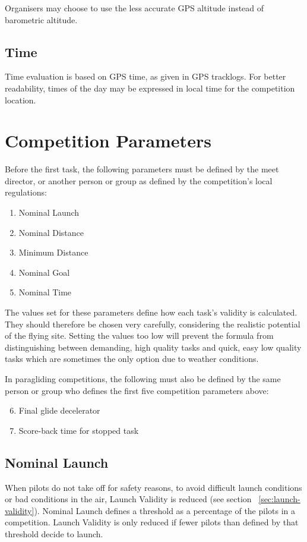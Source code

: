 \documentclass{article}
\begin{document}
Organisers may choose to use the less accurate GPS altitude instead of
barometric altitude.

\subsection{Time}
Time evaluation is based on GPS time, as given in GPS tracklogs. For better
readability, times of the day may be expressed in local time for the
competition location.

\newpage
\section{Competition Parameters}
Before the first task, the following parameters must be defined by the meet
director, or another person or group as defined by the competition’s local
regulations:
\begin{enumerate}
    \item Nominal Launch
    \item Nominal Distance
    \item Minimum Distance
    \item Nominal Goal
    \item Nominal Time
\end{enumerate}
The values set for these parameters define how each task’s validity is
calculated. They should therefore be chosen very carefully, considering the
realistic potential of the flying site. Setting the values too low will prevent
the formula from distinguishing between demanding, high quality tasks and
quick, easy low quality tasks which are sometimes the only option due to
weather conditions.

\begin{pg}
In paragliding competitions, the following must also be defined by the same
person or group who defines the first five competition parameters above:
\begin{enumerate}
    \setcounter{enumi}{5}
    \item Final glide decelerator
    \item Score-back time for stopped task
\end{enumerate}
\end{pg}

\subsection{Nominal Launch}
\label{sec:nominal-launch}
When pilots do not take off for safety reasons, to avoid difficult launch
conditions or bad conditions in the air, Launch Validity is reduced (see
section ~\ref{sec:launch-validity}). Nominal Launch defines a threshold as a percentage of the pilots
in a competition. Launch Validity is only reduced if fewer pilots than defined
by that threshold decide to launch.
\end{document}
